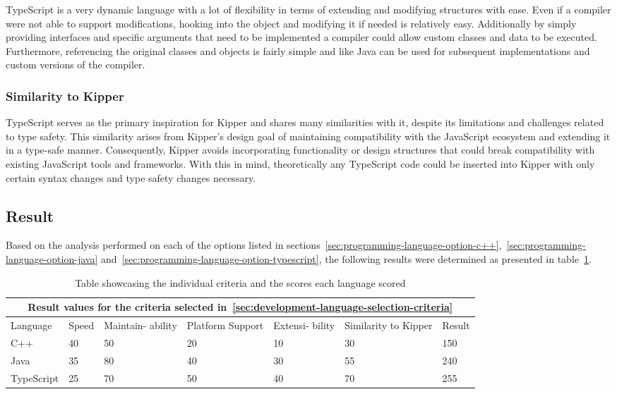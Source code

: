 TypeScript is a very dynamic language with a lot of flexibility in terms of extending and modifying structures with ease. Even if a compiler were not able to support modifications, hooking into the object and modifying it if needed is relatively easy. Additionally by simply providing interfaces and specific arguments that need to be implemented a compiler could allow custom classes and data to be executed. Furthermore, referencing the original classes and objects is fairly simple and like Java can be used for subsequent implementations and custom versions of the compiler.

\subsubsection{Similarity to Kipper}

TypeScript serves as the primary inspiration for Kipper and shares many similarities with it, despite its limitations and challenges related to type safety. This similarity arises from Kipper's design goal of maintaining compatibility with the JavaScript ecosystem and extending it in a type-safe manner. Consequently, Kipper avoids incorporating functionality or design structures that could break compatibility with existing JavaScript tools and frameworks. With this in mind, theoretically any TypeScript code could be inserted into Kipper with only certain syntax changes and type safety changes necessary.

\subsection{Result}

Based on the analysis performed on each of the options listed in sections~\ref{sec:programming-language-option-c++},~\ref{sec:programming-language-option-java} and~\ref{sec:programming-language-option-typescript}, the following results were determined as presented in table~\ref{tab:programming-language-results}.

\begin{table}[H]
	\centering
	\begin{tabular}{ |p{2cm}|p{1.8cm}|p{1.8cm}|p{1.8cm}|p{1.8cm}|p{1.8cm}|p{1.2cm}|  }
		\hline
		\multicolumn{7}{|c|}{Result values for the criteria selected in~\ref{sec:development-language-selection-criteria}} \\
		\hline
		Language&Speed&Maintain- ability&Platform Support&Extensi- bility&Similarity to Kipper&Result\\
		\hline
		C++&40&50&20&10&30&150\\
		Java&35&80&40&30&55&240\\
		TypeScript&25&70&50&40&70&255\\
		\hline
	\end{tabular}
	\caption{Table showcasing the individual criteria and the scores each language scored}
	\label{tab:programming-language-results}
\end{table}

